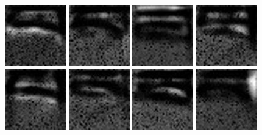 \documentclass[10pt]{article}
\begin{document}
			\begin{center}
				\includegraphics{stro0.jpg}
				\includegraphics{stro1.jpg}
				\includegraphics{stro2.jpg}
				\includegraphics{stro3.jpg} \\
				\includegraphics{stro4.jpg}
				\includegraphics{stro5.jpg}
				\includegraphics{stro6.jpg}
				\includegraphics{stro7.jpg} \\

\end{center}
\end{document}
